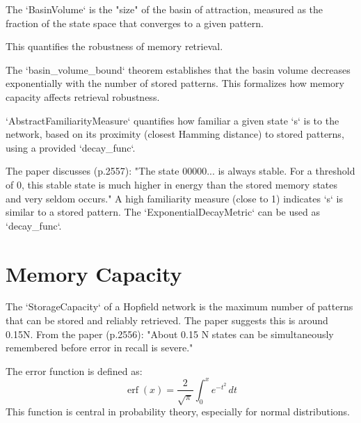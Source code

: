 \begin{definition}\label{BasinVolume}
\leanok
The `BasinVolume` is the "size" of the basin of attraction, measured as the
fraction of the state space that converges to a given pattern.

This quantifies the robustness of memory retrieval.
\end{definition}

\begin{theorem}\label{basin_volume_bound}
\leanok
The `basin\_volume\_bound` theorem establishes that the basin volume decreases
exponentially with the number of stored patterns.
This formalizes how memory capacity affects retrieval robustness.
\end{theorem}

\begin{definition}\label{AbstractFamiliarityMeasure}
\leanok
`AbstractFamiliarityMeasure` quantifies how familiar a given state `s` is to the network,
based on its proximity (closest Hamming distance) to stored patterns, using a provided `decay\_func`.

The paper discusses (p.2557): "The state 00000... is always stable. For a threshold of 0, this
stable state is much higher in energy than the stored memory states and very seldom occurs."
A high familiarity measure (close to 1) indicates `s` is similar to a stored pattern.
The `ExponentialDecayMetric` can be used as `decay\_func`.
\end{definition}


\section{Memory Capacity}

\begin{definition}\label{StorageCapacity}
\leanok
The `StorageCapacity` of a Hopfield network is the maximum number of patterns
that can be stored and reliably retrieved. The paper suggests this is around 0.15N.
From the paper (p.2556): "About 0.15 N states can be simultaneously remembered before
error in recall is severe."
\end{definition}

\begin{definition}\label{Real.erf}
\leanok
The error function is defined as:
  \[
\operatorname{erf}(x) = \frac{2}{\sqrt{\pi}} \int_0^x e^{-t^2} \, dt
\]
This function is central in probability theory, especially for normal distributions.
\end{definition}

